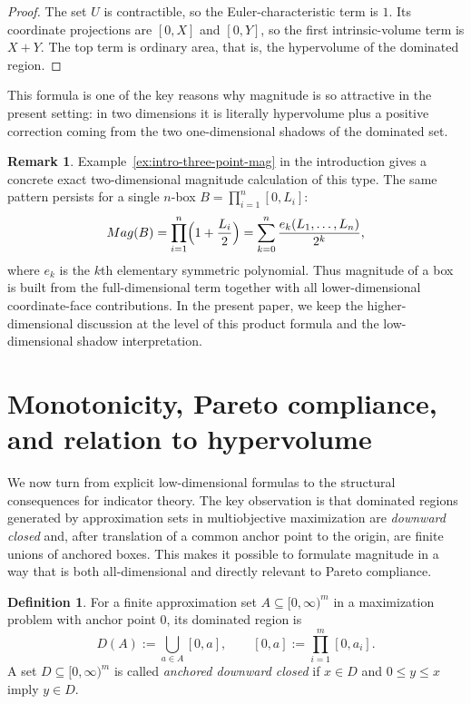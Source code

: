 \documentclass{article}
\def\Mag{Mag}%
\theoremstyle{definition}
\newtheorem{definition}[theorem]{Definition}
\newtheorem{remark}[theorem]{Remark}
\newcommand{\Mag}{\operatorname{Mag}}
\newcommand{\1}{\mathbf{1}}
\begin{document}
\begin{proof}
The set \(U\) is contractible, so the Euler-characteristic term is \(1\). Its coordinate projections are \([0,X]\) and \([0,Y]\), so the first intrinsic-volume term is \(X+Y\). The top term is ordinary area, that is, the hypervolume of the dominated region.
\end{proof}

This formula is one of the key reasons why magnitude is so attractive in the present setting: in two dimensions it is literally hypervolume plus a positive correction coming from the two one-dimensional shadows of the dominated set.

\begin{remark}
Example~\ref{ex:intro-three-point-mag} in the introduction gives a concrete exact two-dimensional magnitude calculation of this type. The same pattern persists for a single \(n\)-box \(B=\prod_{i=1}^n [0,L_i]\):
\[
\Mag(B)=\prod_{i=1}^n\Bigl(1+\frac{L_i}{2}\Bigr)=\sum_{k=0}^n \frac{e_k(L_1,\dots,L_n)}{2^k},
\]
where \(e_k\) is the \(k\)th elementary symmetric polynomial. Thus magnitude of a box is built from the full-dimensional term together with all lower-dimensional coordinate-face contributions. In the present paper, we keep the higher-dimensional discussion at the level of this product formula and the low-dimensional shadow interpretation.
\end{remark}

\section{Monotonicity, Pareto compliance, and relation to hypervolume}

We now turn from explicit low-dimensional formulas to the structural consequences for indicator theory. The key observation is that dominated regions generated by approximation sets in multiobjective maximization are \emph{downward closed} and, after translation of a common anchor point to the origin, are finite unions of anchored boxes. This makes it possible to formulate magnitude in a way that is both all-dimensional and directly relevant to Pareto compliance.

\begin{definition}
For a finite approximation set $A\subseteq [0,\infty)^m$ in a maximization problem with anchor point $0$, its dominated region is
\[
D(A):=\bigcup_{a\in A}[0,a],
\qquad
[0,a]:=\prod_{i=1}^m [0,a_i].
\]
A set $D\subseteq [0,\infty)^m$ is called \emph{anchored downward closed} if $x\in D$ and $0\le y\le x$ imply $y\in D$.
\end{definition}
\end{document}
